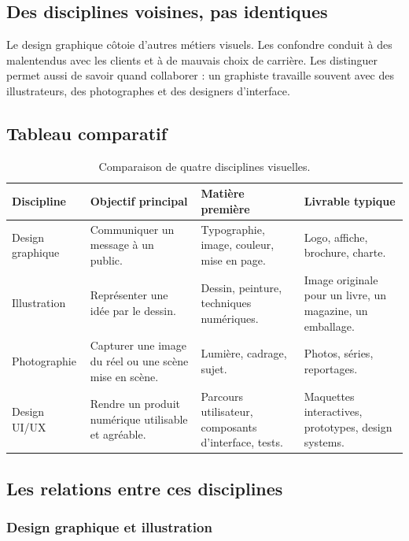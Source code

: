 \subsection{Des disciplines voisines, pas identiques}

Le design graphique côtoie d'autres métiers visuels. Les confondre conduit à des malentendus avec les clients et à de mauvais choix de carrière. Les distinguer permet aussi de savoir quand collaborer : un graphiste travaille souvent avec des illustrateurs, des photographes et des designers d'interface.

\subsection{Tableau comparatif}

\begin{table}[h!]
\centering
\begin{tabular}{@{}p{2.6cm}p{3.1cm}p{3.7cm}p{4.6cm}@{}}
\toprule
\textbf{Discipline} & \textbf{Objectif principal} & \textbf{Matière première} & \textbf{Livrable typique} \\
\midrule
Design graphique & Communiquer un message à un public. & Typographie, image, couleur, mise en page. & Logo, affiche, brochure, charte. \\
Illustration & Représenter une idée par le dessin. & Dessin, peinture, techniques numériques. & Image originale pour un livre, un magazine, un emballage. \\
Photographie & Capturer une image du réel ou une scène mise en scène. & Lumière, cadrage, sujet. & Photos, séries, reportages. \\
Design UI/UX & Rendre un produit numérique utilisable et agréable. & Parcours utilisateur, composants d'interface, tests. & Maquettes interactives, prototypes, design systems. \\
\bottomrule
\end{tabular}
\caption{Comparaison de quatre disciplines visuelles.}
\end{table}

\subsection{Les relations entre ces disciplines}

\subsubsection{Design graphique et illustration}

